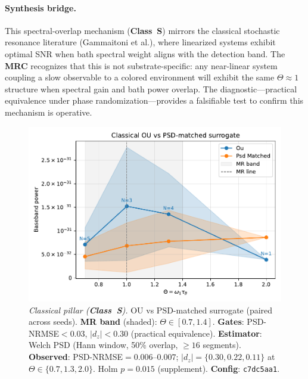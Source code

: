 \documentclass[11pt,letterpaper]{article}
\newcommand{\confighash}{c7dc5aa1}
\DeclareRobustCommand{\mrc}{\textbf{MRC}\xspace}
\DeclareRobustCommand{\classS}{\textbf{Class~S}\xspace}
\begin{document}
\paragraph*{Synthesis bridge.} This spectral-overlap mechanism (\classS) mirrors the classical stochastic resonance literature (Gammaitoni et al.), where linearized systems exhibit optimal SNR when bath spectral weight aligns with the detection band. The \mrc recognizes that this is not substrate-specific: any near-linear system coupling a slow observable to a colored environment will exhibit the same $\Theta\!\approx\!1$ structure when spectral gain and bath power overlap. The diagnostic---practical equivalence under phase randomization---provides a falsifiable test to confirm this mechanism is operative.

\begin{figure}[t]
\centering
\includegraphics[width=0.8\linewidth]{figA_classical.pdf}
\caption{\emph{Classical pillar (\classS).} OU vs PSD-matched surrogate (paired across seeds). \textbf{MR band} (shaded): $\Theta\in[0.7,1.4]$. \textbf{Gates}: PSD-NRMSE$<0.03$, $|d_z|<0.30$ (practical equivalence). \textbf{Estimator}: Welch PSD (Hann window, 50\% overlap, $\ge\!16$ segments). \textbf{Observed}: PSD-NRMSE$=0.006$--$0.007$; $|d_z|=\{0.30,0.22,0.11\}$ at $\Theta\in\{0.7,1.3,2.0\}$. Holm $p=0.015$ (supplement). \textbf{Config}: \texttt{\confighash}.}
\end{figure}
\end{document}
